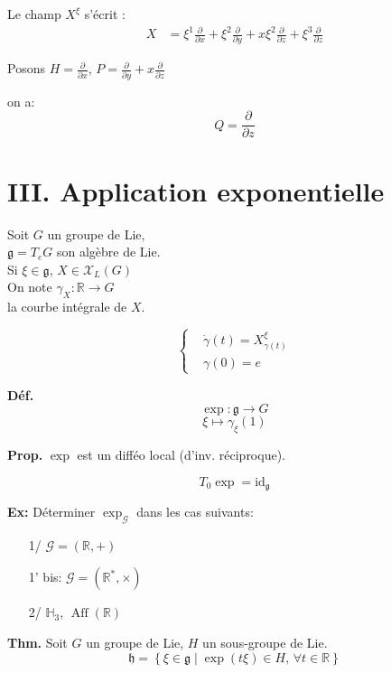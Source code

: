 \documentclass[11pt,a4paper]{article}
\begin{document}
Le champ $X^\xi$ s'écrit :
\begin{align*}
	X &= \xi^1 \frac{\partial}{\partial x} + \xi^2 \frac{\partial}{\partial y} + x \xi^2 \frac{\partial}{\partial z}
	+ \xi^3 \frac{\partial}{\partial z}
\end{align*}

Posons $H = \frac{\partial}{\partial x}$, $P = \frac{\partial}{\partial y} + x \frac{\partial}{\partial z}$

on a:
\[
Q = \frac{\partial}{\partial z}
\]

\section*{III. Application exponentielle}

Soit \( G \) un groupe de Lie, \\
\(\mathfrak{g} = T_e G\) son algèbre de Lie. \\

Si \( \xi \in \mathfrak{g} \), \( X \in \mathcal{X}_L(G) \) \\

On note \( \gamma_X : \mathbb{R} \longrightarrow G \) \\
la courbe intégrale de \( X \).

\[
\left\{
\begin{aligned}
	&\dot{\gamma}(t) = X^{\xi}_{\gamma(t)} \\
	&\gamma(0) = e
\end{aligned}
\right.
\]

\textbf{Déf.} \quad 
\[
\exp : \mathfrak{g} \longrightarrow G
\]
\[
\xi \longmapsto \gamma_\xi(1)
\]

\textbf{Prop.} \quad \(\exp\) est un difféo local (d'inv. réciproque).

\[
T_0 \exp = \mathrm{id}_{\mathfrak{g}}
\]


\textbf{Ex:} Déterminer \(\exp_{\mathcal{G}}\) dans les cas suivants: 
\begin{itemize}
	\item[1/] \(\mathcal{G} = (\mathbb{R}, +)\)
	\item[1' bis:] \(\mathcal{G} = (\mathbb{R}^*, \times)\)
	\item[2/] \(\mathbb{H}_3\), \(\operatorname{Aff}(\mathbb{R})\)
\end{itemize}


\textbf{Thm.} Soit \( G \) un groupe de Lie, \( H \) un sous-groupe de Lie.
\[
\mathfrak{h} = \left\{ \xi \in \mathfrak{g} \mid \exp(t \xi) \in H,\, \forall t \in \mathbb{R} \right\}
\]
\end{document}
